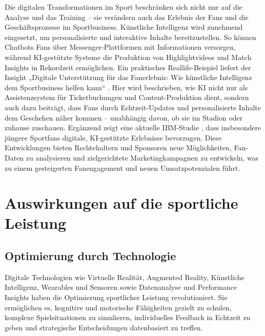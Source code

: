 \documentclass[
  number]{elsarticle}
\begin{document}
Die digitalen Transformationen im Sport beschränken sich nicht nur auf
die Analyse und das Training -- sie verändern auch das Erlebnis der Fans
und die Geschäftsprozesse im Sportbusiness. Künstliche Intelligenz wird
zunehmend eingesetzt, um personalisierte und interaktive Inhalte
bereitzustellen. So können Chatbots Fans über Messenger-Plattformen mit
Informationen versorgen, während KI-gestützte Systeme die Produktion von
Highlightvideos und Match Insights in Rekordzeit ermöglichen. Ein
praktisches Reallife-Beispiel liefert der Insight „Digitale
Unterstützung für das Fanerlebnis: Wie künstliche Intelligenz dem
Sportbusiness helfen kann`` \citep{sportfive_fan}. Hier wird
beschrieben, wie KI nicht nur als Assistenzsystem für Ticketbuchungen
und Content-Produktion dient, sondern auch dazu beiträgt, dass Fans
durch Echtzeit-Updates und personalisierte Inhalte dem Geschehen näher
kommen -- unabhängig davon, ob sie im Stadion oder zuhause zuschauen.
Ergänzend zeigt eine aktuelle IBM-Studie \citep{ibm_fanengagement}, dass
insbesondere jüngere Sportfans digitale, KI-gestützte Erlebnisse
bevorzugen. Diese Entwicklungen bieten Rechtehaltern und Sponsoren neue
Möglichkeiten, Fan-Daten zu analysieren und zielgerichtete
Marketingkampagnen zu entwickeln, was zu einem gesteigerten
Fanengagement und neuen Umsatzpotenzialen führt.

\section{Auswirkungen auf die sportliche
Leistung}\label{auswirkungen-auf-die-sportliche-leistung}

\subsection{Optimierung durch
Technologie}\label{optimierung-durch-technologie}

Digitale Technologien wie Virtuelle Realität, Augmented Reality,
Künstliche Intelligenz, Wearables und Sensoren sowie Datenanalyse und
Performance Insights haben die Optimierung sportlicher Leistung
revolutioniert. Sie ermöglichen es, kognitive und motorische Fähigkeiten
gezielt zu schulen, komplexe Spielsituationen zu simulieren,
individuelles Feedback in Echtzeit zu geben und strategische
Entscheidungen datenbasiert zu treffen.
\end{document}
